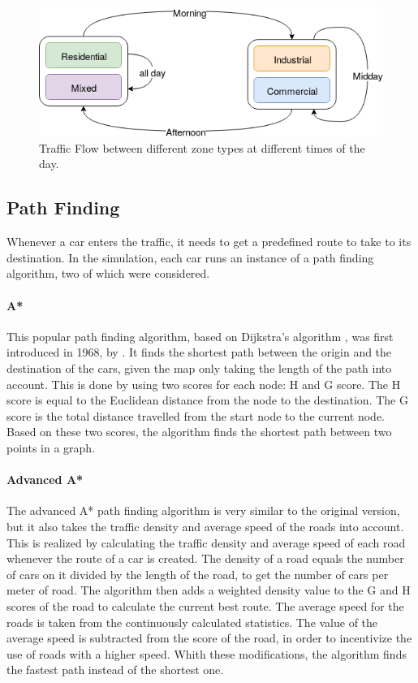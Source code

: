 \documentclass[11pt]{article}
\begin{document}
\begin{figure}
	\includegraphics[width=\linewidth]{img/zoned-traffic-flow.png}
	\caption{Traffic Flow between different zone types at different times of the day. \label{fig:zone-traffic-flow}}
\end{figure}

\subsection{Path Finding}
Whenever a car enters the traffic, it needs to get a predefined route to take to its destination. In the simulation, each car runs an instance of a path finding algorithm, two of which were considered.

\paragraph{A*}
This popular path finding algorithm, based on Dijkstra’s algorithm \citep{dijkstra1959note}, was first introduced in 1968, by \citet{hart1968formal}. It finds the shortest path between the origin and the destination of the cars, given the map only taking the length of the path into account. This is done by using two scores for each node: H and G score. The H score is equal to the Euclidean distance from the node to the destination. The G score is the total distance travelled from the start node to the current node. Based on these two scores, the algorithm finds the shortest path between two points in a graph. 

\paragraph{Advanced A*}
The advanced A* path finding algorithm is very similar to the original version, but it also takes the traffic density and average speed of the roads into account. This is realized by calculating the traffic density and average speed of each road whenever the route of a car is created. The density of a road equals the number of cars on it divided by the length of the road, to get the number of cars per meter of road. The algorithm then adds a weighted density value to the G and H scores of the road to calculate the current best route. The average speed for the roads is taken from the continuously calculated statistics. The value of the average speed is subtracted from the score of the road, in order to incentivize the use of roads with a higher speed. Whith these modifications, the algorithm finds the fastest path instead of the shortest one.
\end{document}
